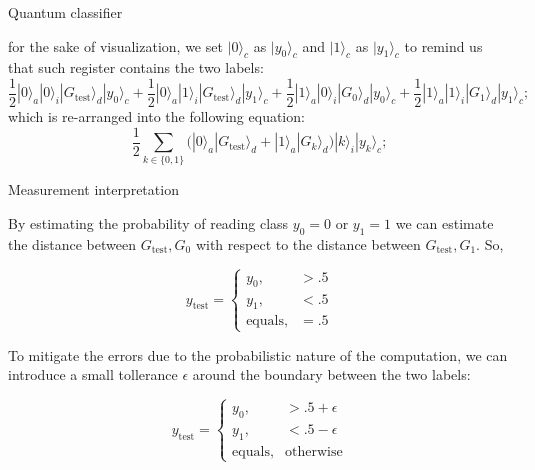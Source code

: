 \begin{frame}{Quantum classifier}
{\begin{itemize}
for the sake of visualization, we set $|0\rangle_c$ as $|y_0\rangle_c$ and $|1\rangle_c$ as $|y_1\rangle_c$ to remind us that such register contains the two labels:
{\footnotesize $$\frac{1}{2} |0\rangle_a |0\rangle_i |G_\text{test}\rangle_d |y_0\rangle_c
+ \frac{1}{2} |0\rangle_a |1\rangle_i |G_\text{test}\rangle_d |y_1\rangle_c
+ \frac{1}{2} |1\rangle_a |0\rangle_i |G_0\rangle_d |y_0\rangle_c
+ \frac{1}{2} |1\rangle_a |1\rangle_i |G_1\rangle_d |y_1\rangle_c;$$}
which is re-arranged into the following equation:
$$ \frac{1}{2} \sum_{k \in \{0, 1\}} \Big( |0\rangle_a |G_\text{test}\rangle_d + |1\rangle_a |G_k\rangle_d  \Big) |k\rangle_i |y_k\rangle_c;$$
\end{itemize}
}%
%
\end{frame}

\begin{frame}{Measurement interpretation}

By estimating the probability of reading class $y_0=0$ or $y_1=1$ we can estimate the distance between $G_\text{test}, G_0$ with respect to the distance between $G_\text{test}, G_1$. So, 

$$y_\text{test} = \begin{cases}
    y_0,           & > .5 \\
    y_1,           & < .5 \\
    \text{equals}, & = .5
\end{cases}$$

To mitigate the errors due to the probabilistic nature of the computation, we can introduce a small tollerance $\epsilon$ around the boundary between the two labels:

$$y_\text{test} = \begin{cases}
    y_0, & > .5+\epsilon \\
    y_1, & < .5-\epsilon \\
    \text{equals}, & \text{otherwise}
\end{cases}$$
\end{frame}
